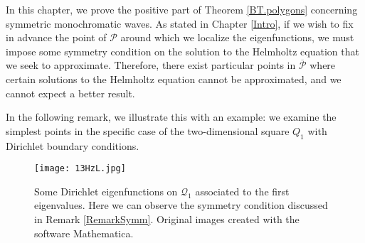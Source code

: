 \documentclass{amsart}
\theoremstyle{definition}
\theoremstyle{remark}
\numberwithin{equation}{section}
\theoremstyle{definition}
\theoremstyle{remark}
\begin{document}
    In this chapter, we prove the positive part of Theorem \ref{BT.polygons} concerning symmetric monochromatic waves. As stated in Chapter \ref{Intro}, if we wish to fix in advance the point of $\mathcal{P}$ around which we localize the eigenfunctions, we must impose some symmetry condition on the solution to the Helmholtz equation that we seek to approximate. Therefore, there exist particular points in $\overline{\mathcal{P}}$ where certain solutions to the Helmholtz equation cannot be approximated, and we cannot expect a better result. 

In the following remark, we illustrate this with an example: we examine the simplest points in the specific case of the two-dimensional square $Q_1$ with Dirichlet boundary conditions.



\begin{figure}\renewcommand\thefigure{4.1}
	\texttt{[image: 13HzL.jpg]}
	\caption{Some Dirichlet eigenfunctions on $\mathcal{Q}_1$ associated to the first eigenvalues. Here we can observe the symmetry condition discussed in Remark \ref{RemarkSymm}. Original images created with the software Mathematica.  }
\end{figure}
\end{document}
